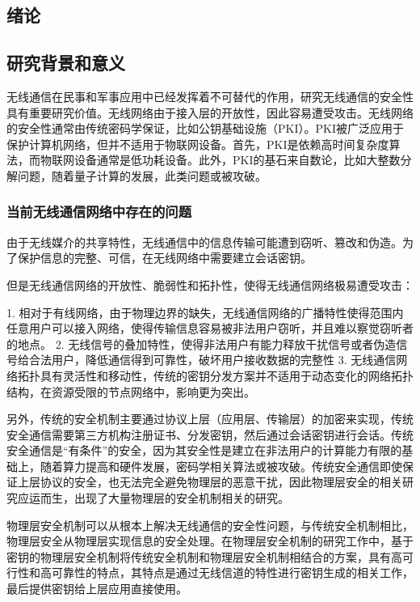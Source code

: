 \documentclass[master]{seuthesis} %
\begin{document}
\begin{Main} %

\chapter{绪论}
\section{研究背景和意义}

无线通信在民事和军事应用中已经发挥着不可替代的作用，研究无线通信的安全性具有重要研究价值。无线网络由于接入层的开放性，因此容易遭受攻击。无线网络的安全性通常由传统密码学保证，比如公钥基础设施（PKI）。PKI被广泛应用于保护计算机网络，但并不适用于物联网设备。首先，PKI是依赖高时间复杂度算法，而物联网设备通常是低功耗设备。此外，PKI的基石来自数论，比如大整数分解问题，随着量子计算的发展，此类问题或被攻破。

\subsection{当前无线通信网络中存在的问题}

由于无线媒介的共享特性，无线通信中的信息传输可能遭到窃听、篡改和伪造。为了保护信息的完整、可信，在无线网络中需要建立会话密钥。

但是无线通信网络的开放性、脆弱性和拓扑性，使得无线通信网络极易遭受攻击：

1. 相对于有线网络，由于物理边界的缺失，无线通信网络的广播特性使得范围内任意用户可以接入网络，使得传输信息容易被非法用户窃听，并且难以察觉窃听者的地点。
2. 无线信号的叠加特性，使得非法用户有能力释放干扰信号或者伪造信号给合法用户，降低通信得到可靠性，破坏用户接收数据的完整性
3. 无线通信网络拓扑具有灵活性和移动性，传统的密钥分发方案并不适用于动态变化的网络拓扑结构，在资源受限的节点网络中，影响更为突出。

另外，传统的安全机制主要通过协议上层（应用层、传输层）的加密来实现，传统安全通信需要第三方机构注册证书、分发密钥，然后通过会话密钥进行会话。传统安全通信是“有条件”的安全，因为其安全性是建立在非法用户的计算能力有限的基础上，随着算力提高和硬件发展，密码学相关算法或被攻破。传统安全通信即使保证上层协议的安全，也无法完全避免物理层的恶意干扰，因此物理层安全的相关研究应运而生，出现了大量物理层的安全机制相关的研究。

物理层安全机制可以从根本上解决无线通信的安全性问题，与传统安全机制相比，物理层安全从物理层实现信息的安全处理。在物理层安全机制的研究工作中，基于密钥的物理层安全机制将传统安全机制和物理层安全机制相结合的方案，具有高可行性和高可靠性的特点，其特点是通过无线信道的特性进行密钥生成的相关工作，最后提供密钥给上层应用直接使用。


\end{Main}
\end{document}
